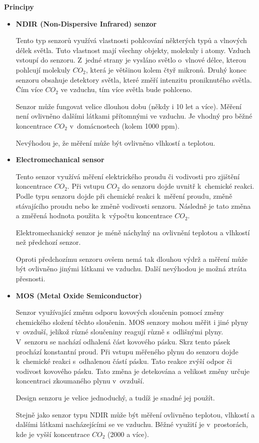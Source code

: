 \noindent\textbf{Principy}
\begin{itemize}
  \item \textbf{NDIR (Non-Dispersive Infrared) senzor}
  
  Tento typ senzorů využívá vlastnosti pohlcování některých typů a vlnových délek světla. Tuto vlastnost mají všechny objekty, molekuly i atomy. Vzduch vstoupí do senzoru. Z~jedné strany je vysláno světlo o~vlnové délce, kterou pohlcují molekuly $CO_2$, která je většinou kolem čtyř mikronů. Druhý konec senzoru obsahuje detektory světla, které změří intenzitu proniknutého světla. Čím více $CO_2$ ve vzduchu, tím více světla bude pohlceno.
  
  Senzor může fungovat velice dlouhou dobu (někdy i 10 let a více). Měření není ovlivněno dalšími látkami přítomnými ve vzduchu. Je vhodný pro běžné koncentrace $CO_2$ v~domácnostech (kolem 1000 ppm).
  
  Nevýhodou je, že měření může být ovlivněno vlhkostí a teplotou.
  \item \textbf{Electromechanical sensor}
  
  Tento senzor využívá měření elektrického proudu či vodivosti pro zjištění koncentrace $CO_2$. Při vstupu $CO_2$ do senzoru dojde uvnitř k~chemické reakci. Podle typu senzoru dojde při chemické reakci k~měření proudu, změně stávajícího proudu nebo ke změně vodivosti senzoru. Následně je tato změna a změřená hodnota použita k~výpočtu koncentrace $CO_2$.
  
  Elektromechanický senzor je méně náchylný na ovlivnění teplotou a vlhkostí než předchozí senzor.
  
  Oproti předchozímu senzoru ovšem nemá tak dlouhou výdrž a měření může být ovlivněno jinými látkami ve vzduchu. Další nevýhodou je možná ztráta přesnosti.
  \item \textbf{MOS (Metal Oxide Semiconductor)}
  
  Senzor využívající změnu odporu kovových sloučenin pomocí změny chemického složení těchto sloučenin. MOS senzory mohou měřit i jiné plyny v~ovzduší, jelikož různé sloučeniny reagují různě s~odlišnými plyny. V~senzoru se nachází odhalená část kovového pásku. Skrz tento pásek prochází konstantní proud. Při vstupu měřeného plynu do senzoru dojde k~chemické reakci s~odhalenou částí pásku. Tato reakce zvýší odpor či vodivost kovového pásku. Tato změna je detekována a velikost změny určuje koncentraci zkoumaného plynu v~ovzduší. 

  Design senzoru je velice jednoduchý, a tudíž je snadné jej použít.

  Stejně jako senzor typu NDIR může být měření ovlivněno teplotou, vlhkostí a dalšími látkami nacházejícími se ve vzduchu. Běžné využití je v~prostorách, kde je vyšší koncentrace $CO_2$ (2000 a více). 
\end{itemize}

